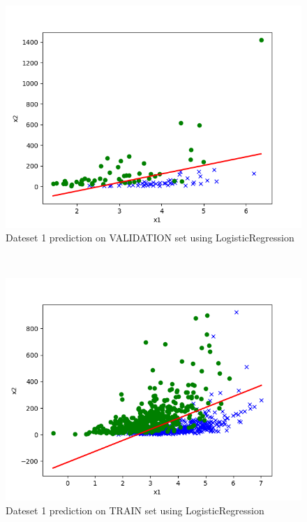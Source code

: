 \begin{answer}\\
\begin{figure}
  \includegraphics[width=\linewidth]{../src/output/p01b_pred_1_eval.png}
  \caption{Dateset 1 prediction on VALIDATION set using LogisticRegression}
  \label{fig:Dateset 1 prediction on VALIDATION set using LogisticRegression}
\end{figure}\\
\begin{figure}
  \includegraphics[width=\linewidth]{../src/output/p01b_pred_1_train.png}
  \caption{Dateset 1 prediction on TRAIN set using LogisticRegression}
  \label{fig:Dateset 1 prediction on TRAIN set using LogisticRegression}

\end{figure}
\end{answer}
